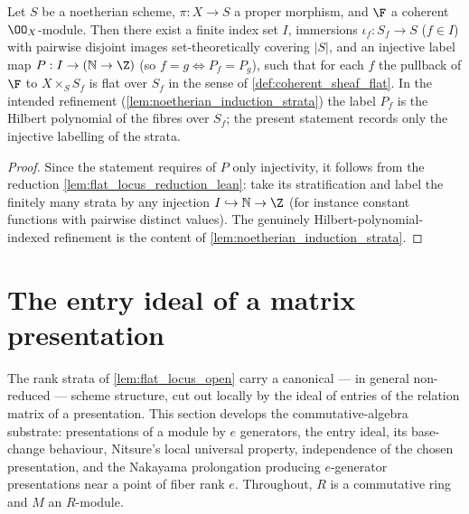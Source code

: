 \begin{lemma}

  \label{lem:flat_locus_assembly_lean}
  Let \(S\) be a noetherian scheme, \(\pi : X \to S\) a proper morphism,
  and \(\F\) a coherent \(\OO_X\)-module. Then there exist a finite index set
  \(I\), immersions \(\iota_f : S_f \to S\) (\(f \in I\)) with pairwise disjoint
  images set-theoretically covering \(|S|\), and an injective label map
  \(P : I \to (\mathbb{N} \to \Z)\) (so \(f = g \iff P_f = P_g\)), such that for
  each \(f\) the pullback of \(\F\) to \(X \times_S S_f\) is flat over \(S_f\) in
  the sense of \cref{def:coherent_sheaf_flat}.  In the intended refinement
  (\cref{lem:noetherian_induction_strata}) the label \(P_f\) is the Hilbert
  polynomial of the fibres over \(S_f\); the present statement records only
  the injective labelling of the strata.
\end{lemma}

\begin{proof}
  \leanok
  Since the statement requires of \(P\) only injectivity, it follows from the
  reduction \cref{lem:flat_locus_reduction_lean}: take its stratification and
  label the finitely many strata by any injection
  \(I \hookrightarrow \mathbb{N} \to \Z\) (for instance constant functions
  with pairwise distinct values).  The genuinely Hilbert-polynomial-indexed
  refinement is the content of \cref{lem:noetherian_induction_strata}.
\end{proof}

\section{The entry ideal of a matrix presentation}
\label{sec:entry_ideal}

The rank strata of \cref{lem:flat_locus_open} carry a canonical --- in
general non-reduced --- scheme structure, cut out locally by the ideal of
entries of the relation matrix of a presentation.  This section develops the
commutative-algebra substrate: presentations of a module by \(e\)
generators, the entry ideal, its base-change behaviour, Nitsure's local
universal property, independence of the chosen presentation, and the
Nakayama prolongation producing \(e\)-generator presentations near a point
of fiber rank \(e\).  Throughout, \(R\) is a commutative ring and \(M\) an
\(R\)-module.

